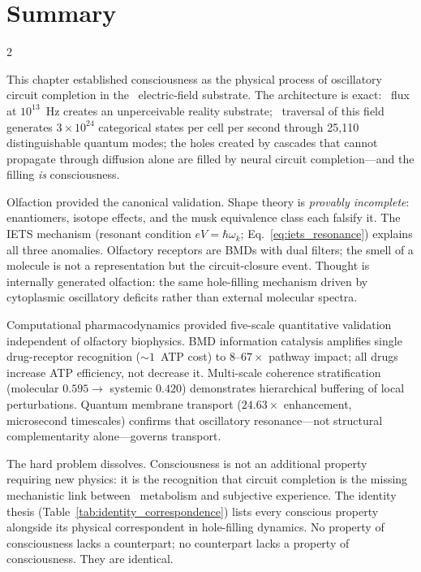 \section{Summary}
\label{sec:cc_summary}

\begin{multicols}{2}

This chapter established consciousness as the physical process of oscillatory
circuit completion in the \Hplus\ electric-field substrate.  The architecture
is exact: \Hplus\ flux at $10^{13}$~Hz creates an unperceivable reality
substrate; \Otwo\ traversal of this field generates $3\times10^{24}$
categorical states per cell per second through 25,110 distinguishable
quantum modes; the holes created by cascades that cannot propagate
through diffusion alone are filled by neural circuit completion---and
the filling \emph{is} consciousness.

Olfaction provided the canonical validation.  Shape theory is
\emph{provably incomplete}: enantiomers, isotope effects, and the musk
equivalence class each falsify it.  The IETS mechanism (resonant condition
$eV = \hbar\omega_k$; Eq.~\eqref{eq:iets_resonance}) explains all three
anomalies.  Olfactory receptors are BMDs with dual filters; the smell of
a molecule is not a representation but the circuit-closure event.  Thought
is internally generated olfaction: the same hole-filling mechanism driven
by cytoplasmic oscillatory deficits rather than external molecular spectra.

Computational pharmacodynamics provided five-scale quantitative validation
independent of olfactory biophysics.  BMD information catalysis amplifies
single drug-receptor recognition ($\sim1$~ATP cost) to $8$--$67\times$
pathway impact; all drugs increase ATP efficiency, not decrease it.
Multi-scale coherence stratification (molecular $0.595 \to$ systemic
$0.420$) demonstrates hierarchical buffering of local perturbations.
Quantum membrane transport ($24.63\times$ enhancement, microsecond
timescales) confirms that oscillatory resonance---not structural
complementarity alone---governs transport.

The hard problem dissolves.  Consciousness is not an additional property
requiring new physics: it is the recognition that circuit completion is
the missing mechanistic link between \Otwo\ metabolism and subjective
experience.  The identity thesis (Table~\ref{tab:identity_correspondence})
lists every conscious property alongside its physical correspondent in
hole-filling dynamics.  No property of consciousness lacks a counterpart;
no counterpart lacks a property of consciousness.  They are identical.


\end{multicols}
